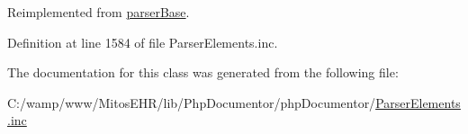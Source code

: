 \-Reimplemented from \hyperlink{classparser_base_a9a4a6fba2208984cabb3afacadf33919}{parser\-Base}.



\-Definition at line 1584 of file \-Parser\-Elements.\-inc.



\-The documentation for this class was generated from the following file\-:\begin{DoxyCompactItemize}
\item 
\-C\-:/wamp/www/\-Mitos\-E\-H\-R/lib/\-Php\-Documentor/php\-Documentor/\hyperlink{_parser_elements_8inc}{\-Parser\-Elements.\-inc}\end{DoxyCompactItemize}
